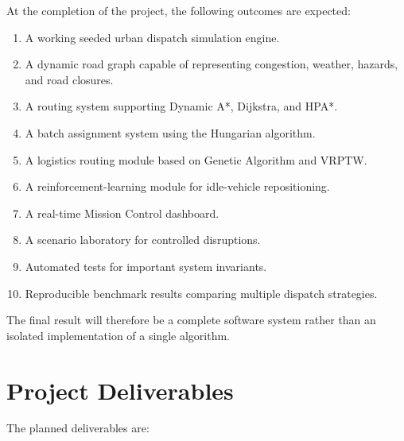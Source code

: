 \documentclass[12pt,a4paper]{article}
\begin{document}
At the completion of the project, the following outcomes are
expected:

\begin{enumerate}
    \item A working seeded urban dispatch simulation engine.

    \item A dynamic road graph capable of representing congestion,
    weather, hazards, and road closures.

    \item A routing system supporting Dynamic A*, Dijkstra, and HPA*.

    \item A batch assignment system using the Hungarian algorithm.

    \item A logistics routing module based on Genetic Algorithm and
    VRPTW.

    \item A reinforcement-learning module for idle-vehicle
    repositioning.

    \item A real-time Mission Control dashboard.

    \item A scenario laboratory for controlled disruptions.

    \item Automated tests for important system invariants.

    \item Reproducible benchmark results comparing multiple dispatch
    strategies.
\end{enumerate}

The final result will therefore be a complete software system rather
than an isolated implementation of a single algorithm.





\section{Project Deliverables}

The planned deliverables are:
\end{document}
